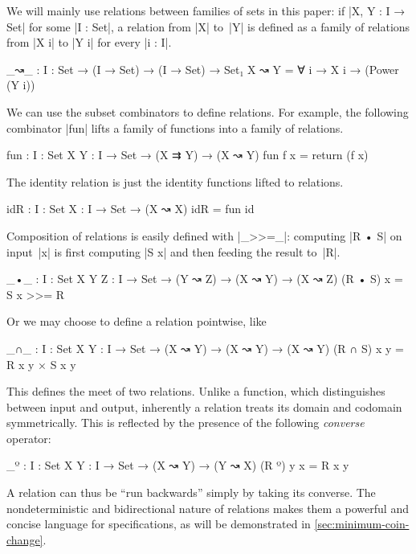 We will mainly use relations between families of sets in this paper: if |X, Y : I → Set| for some |I : Set|, a relation from |X| to~|Y| is defined as a family of relations from |X i| to |Y i| for every |i : I|.
\begin{code}
_↝_ : {I : Set} → (I → Set) → (I → Set) → Set₁
X ↝ Y = ∀ {i} → X i → (Power (Y i))
\end{code}
We can use the subset combinators to define relations.
For example, the following combinator |fun| lifts a family of functions into a family of relations.
\begin{code}
fun : {I : Set} {X Y : I → Set} → (X ⇉ Y) → (X ↝ Y)
fun f x = return (f x)
\end{code}
The identity relation is just the identity functions lifted to relations.
\begin{code}
idR : {I : Set} {X : I → Set} → (X ↝ X)
idR = fun id
\end{code}
Composition of relations is easily defined with |_>>=_|: computing |R • S| on input~|x| is first computing |S x| and then feeding the result to~|R|.
\begin{code}
_•_ :  {I : Set} {X Y Z : I → Set} →
       (Y ↝ Z) → (X ↝ Y) → (X ↝ Z)
(R • S) x = S x >>= R
\end{code}
Or we may choose to define a relation pointwise, like
\begin{code}
_∩_ :  {I : Set} {X Y : I → Set} →
       (X ↝ Y) → (X ↝ Y) → (X ↝ Y)
(R ∩ S) x y = R x y × S x y
\end{code}
This defines the meet of two relations.
Unlike a function, which distinguishes between input and output, inherently a relation treats its domain and codomain symmetrically.
This is reflected by the presence of the following \emph{converse} operator:
\begin{code}
_º : {I : Set} {X Y : I → Set} → (X ↝ Y) → (Y ↝ X)
(R º) y x = R x y
\end{code}
A relation can thus be ``run backwards'' simply by taking its converse.
The nondeterministic and bidirectional nature of relations makes them a powerful and concise language for specifications, as will be demonstrated in \autoref{sec:minimum-coin-change}.

